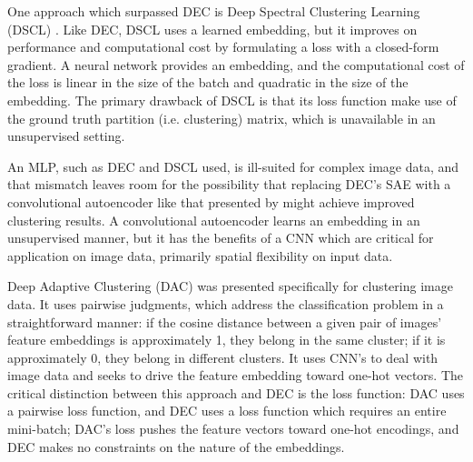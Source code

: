 One approach which surpassed DEC is Deep Spectral Clustering Learning (DSCL) \cite{dscl_law2017deep}. Like DEC, DSCL uses a learned embedding, but it improves on performance and computational cost by formulating a loss with a closed-form gradient. A neural network provides an embedding, and the computational cost of the loss is linear in the size of the batch and quadratic in the size of the embedding. The primary drawback of DSCL is that its loss function make use of the ground truth partition (i.e. clustering) matrix, which is unavailable in an unsupervised setting.

An MLP, such as DEC \cite{xie2016unsupervised} and DSCL \cite{dscl_law2017deep} used, is ill-suited for complex image data, and that mismatch leaves room for the possibility that replacing DEC's SAE with a convolutional autoencoder like that presented by \cite{masci2011stacked} might achieve improved clustering results. A convolutional autoencoder learns an embedding in an unsupervised manner, but it has the benefits of a CNN which are critical for application on image data, primarily spatial flexibility on input data.

Deep Adaptive Clustering (DAC) \cite{chang2017deep} was presented specifically for clustering image data. It uses pairwise judgments, which address the classification problem in a straightforward manner: if the cosine distance between a given pair of images' feature embeddings is approximately 1, they belong in the same cluster; if it is approximately 0, they belong in different clusters. It uses CNN's to deal with image data and seeks to drive the feature embedding toward one-hot vectors. The critical distinction between this approach and DEC is the loss function: DAC uses a pairwise loss function, and DEC uses a loss function which requires an entire mini-batch; DAC's loss pushes the feature vectors toward one-hot encodings, and DEC makes no constraints on the nature of the embeddings.
